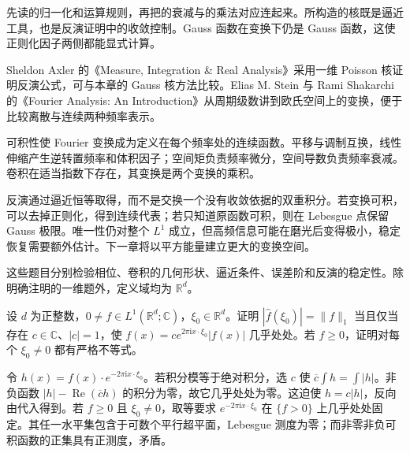 先读的归一化和运算规则，再把的衰减与的乘法对应连起来。所构造的核既是逼近工具，也是反演证明中的收敛控制。Gauss 函数在变换下仍是 Gauss 函数，这使正则化因子两侧都能显式计算。

\ProseParagraphBreak

Sheldon Axler 的《Measure, Integration \& Real Analysis》\cite[Section 11C]{Axler2020Measure}采用一维 Poisson 核证明反演公式，可与本章的 Gauss 核方法比较。Elias M. Stein 与 Rami Shakarchi 的《Fourier Analysis: An Introduction》\cite{Stein2003Fourier}从周期级数讲到欧氏空间上的变换，便于比较离散与连续两种频率表示。







\begin{chaptersummary}
可积性使 Fourier 变换成为定义在每个频率处的连续函数。平移与调制互换，线性伸缩产生逆转置频率和体积因子；空间矩负责频率微分，空间导数负责频率衰减。卷积在适当指数下存在，其变换是两个变换的乘积。

\ProseParagraphBreak

反演通过逼近恒等取得，而不是交换一个没有收敛依据的双重积分。若变换可积，可以去掉正则化，得到连续代表；若只知道原函数可积，则在 Lebesgue 点保留 Gauss 极限。唯一性仍对整个 \(L^1\) 成立，但高频信息可能在磨光后变得极小，稳定恢复需要额外估计。下一章将以平方能量建立更大的变换空间。
\end{chaptersummary}

\BookExercises

这些题目分别检验相位、卷积的几何形状、逼近条件、误差阶和反演的稳定性。除明确注明的一维题外，定义域均为 \(\mathbb R^d\)。

\begin{exercise}\label{b2:ex:03-phase-equality}
设 \(d\) 为正整数，\(0\ne f\in L^1(\mathbb R^d;\mathbb C)\)，\(\xi_0\in\mathbb R^d\)。证明 \(|\widehat f(\xi_0)|=\|f\|_1\) 当且仅当存在 \(c\in\mathbb C\)、\(|c|=1\)，使 \(f(x)=c e^{2\pi\mathrm{i}x\cdot\xi_0}|f(x)|\) 几乎处处。若 \(f\geq0\)，证明对每个 \(\xi_0\ne0\) 都有严格不等式。
\end{exercise}
\begin{solution}
令 \(h(x)=f(x)\cdot e^{-2\pi\mathrm{i}x\cdot\xi_0}\)。若积分模等于绝对积分，选 \(c\) 使 \(\overline c\int h=\int|h|\)。非负函数 \(|h|-\operatorname{Re}(\overline ch)\) 的积分为零，故它几乎处处为零。这迫使 \(h=c|h|\)，反向由代入得到。若 \(f\geq0\) 且 \(\xi_0\ne0\)，取等要求 \(e^{-2\pi\mathrm{i}x\cdot\xi_0}\) 在 \(\{f>0\}\) 上几乎处处固定。其任一水平集包含于可数个平行超平面，Lebesgue 测度为零；而非零非负可积函数的正集具有正测度，矛盾。
\end{solution}


